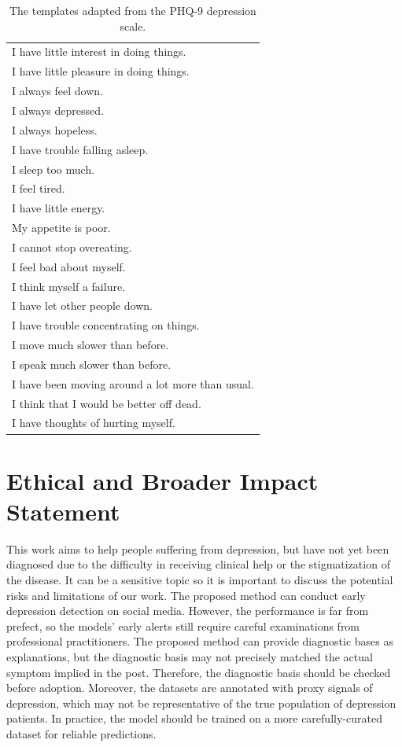\documentclass{article}
\begin{document}
  \begin{table}
    \centering
    \small
    \begin{tabular}{l}
      \hline
      I have little interest in doing things. \\
      I have little pleasure in doing things. \\
      I always feel down. \\
      I always depressed. \\
      I always hopeless. \\
      I have trouble falling asleep. \\
      I sleep too much. \\
      I feel tired. \\
      I have little energy. \\
      My appetite is poor. \\
      I cannot stop overeating. \\
      I feel bad about myself. \\
      I think myself a failure. \\
      I have let other people down. \\
      I have trouble concentrating on things. \\
      I move much slower than before. \\
      I speak much slower than before. \\
      I have been moving around a lot more than usual. \\
      I think that I would be better off dead. \\
      I have thoughts of hurting myself. \\
      \hline
    \end{tabular}
    \caption{The templates adapted from the PHQ-9 depression scale. }
    \label{tab:PHQ-9} 
  \end{table}

\section{Ethical and Broader Impact Statement}

This work aims to help people suffering from depression, but have not yet been diagnosed due to the difficulty in receiving clinical help or the stigmatization of the disease. It can be a sensitive topic so it is important to discuss the potential risks and limitations of our work. The proposed method can conduct early depression detection on social media. However, the performance is far from prefect, so the models' early alerts still require careful examinations from professional practitioners. The proposed method can provide diagnostic bases as explanations, but the diagnostic basis may not precisely matched the actual symptom implied in the post. Therefore, the diagnostic basis should be checked before adoption. Moreover, the datasets are annotated with proxy signals of depression, which may not be representative of the true population of depression patients. In practice, the model should be trained on a more carefully-curated dataset for reliable predictions.
\end{document}
